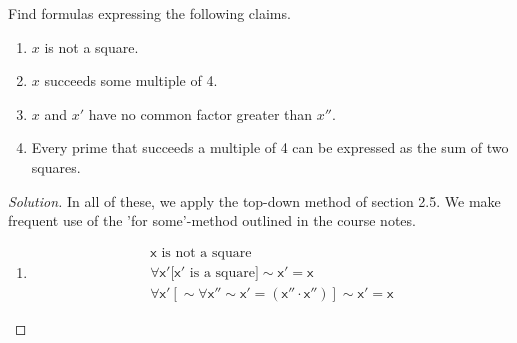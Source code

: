 \begin{problem}
Find formulas expressing the following claims.
  \hfill
  \begin{enumerate}[font=\normalfont,label=\textbf{(\Alph*)}]
    \item $x$ is not a square.
    \item $x$ succeeds some multiple of 4.
    \item $x$ and $x'$ have no common factor greater than $x''$.
    \item Every prime that succeeds a multiple of 4 can be expressed as the sum of two squares.

  \end{enumerate}
\end{problem}
\begin{proof}[Solution]
  In all of these, we apply the top-down method of section 2.5. We make frequent use of the 'for some'-method outlined in the course notes.
  \hfill

  \begin{enumerate}[font=\normalfont,label=\textbf{(\Alph*)}]
    \item
    \[
\begin{aligned}
  \pmb{
    \mathsf{
  x}} \text{ is not a square}
     \\
  \pmb{
    \mathsf{
  \forall x'[x'}} \text{ is a square}\pmb{\mathsf{] \sim x' = x
    }
  } \\
  \pmb{\mathsf{\forall x'[\sim \forall x''\sim x' = (x''\cdot x'')] \sim x' = x}}
\end{aligned}
    \]


\end{enumerate}
\end{proof}
